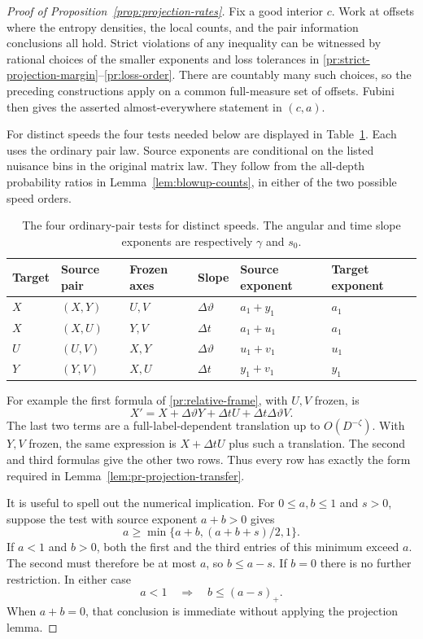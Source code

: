 \begin{proof}[Proof of Proposition~\ref{prop:projection-rates}]
Fix a good interior $c$. Work at offsets where the entropy
densities, the local counts, and the pair information conclusions
all hold. Strict violations of any inequality can be witnessed
by rational choices of the smaller exponents and loss tolerances
in \eqref{pr:strict-projection-margin}--\eqref{pr:loss-order}.
There are countably many such choices, so the preceding
constructions apply on a common full-measure set of offsets.
Fubini then gives the asserted almost-everywhere statement in
$(c,a)$.

For distinct speeds the four tests needed below are displayed in
Table~\ref{tab:pr-tests}. Each uses the ordinary pair law. Source
exponents are conditional on the listed
nuisance bins in the original matrix law. They follow from the
all-depth probability ratios in Lemma~\ref{lem:blowup-counts},
in either of the two possible speed orders.

\begin{table}[htbp]
\centering
\small
\begin{tabular}{@{}llllll@{}}
\toprule
Target & Source pair & Frozen axes & Slope & Source exponent
 & Target exponent\\
\midrule
$X$ & $(X,Y)$ & $U,V$ & $\Delta\vartheta$ & $a_1+y_1$ & $a_1$\\
$X$ & $(X,U)$ & $Y,V$ & $\Delta t$ & $a_1+u_1$ & $a_1$\\
$U$ & $(U,V)$ & $X,Y$ & $\Delta\vartheta$ & $u_1+v_1$ & $u_1$\\
$Y$ & $(Y,V)$ & $X,U$ & $\Delta t$ & $y_1+v_1$ & $y_1$\\
\bottomrule
\end{tabular}
\caption{The four ordinary-pair tests for distinct speeds.
The angular and time slope exponents are respectively
$\gamma$ and $s_0$.}
\label{tab:pr-tests}
\end{table}

For example the first formula of
\eqref{pr:relative-frame}, with $U,V$ frozen, is
\[
 X'=X+\Delta\vartheta Y
       +\Delta t U+\Delta t\Delta\vartheta V.
\]
The last two terms are a full-label-dependent translation up to
$O(D^{-\zeta})$. With $Y,V$ frozen, the same expression is
$X+\Delta t U$ plus such a translation. The second and third
formulas give the other two rows. Thus every row has exactly the
form required in Lemma~\ref{lem:pr-projection-transfer}.

It is useful to spell out the numerical implication. For
$0\le a,b\le1$ and $s>0$, suppose the test with source exponent
$a+b>0$ gives
\begin{equation}
 a\ge\min\{a+b,(a+b+s)/2,1\}.
\label{pr:elementary-test}
\end{equation}
If $a<1$ and $b>0$, both the first and the third entries of this
minimum exceed $a$. The second must therefore be at most $a$,
so $b\le a-s$. If $b=0$ there is no further restriction.
In either case
\begin{equation}
 a<1\quad\Longrightarrow\quad b\le(a-s)_+.
\label{pr:elementary-consequence}
\end{equation}
When $a+b=0$, that conclusion is immediate without applying the
projection lemma.


\end{proof}
